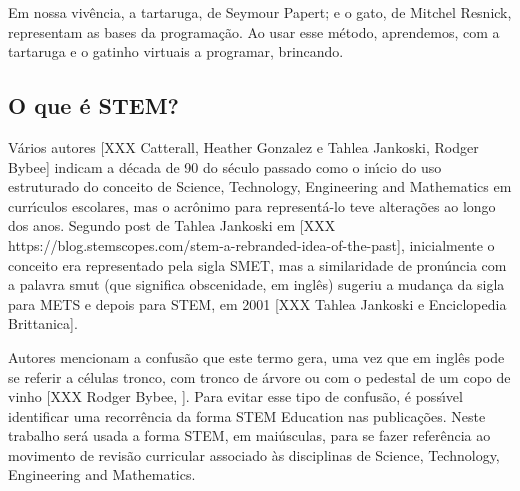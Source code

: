 \documentclass[
12pt,		%
openright,	%
twoside,  %
a4paper,			%
chapter=TITLE,		%
english,			%
french,				%
spanish,			%
brazil				%
]{USPSC-classe/USPSC}
\begin{document}
Em nossa viv\^encia, a tartaruga, de Seymour Papert; e o gato, de Mitchel Resnick,  representam as bases da  programa\c{c}\~ao. Ao usar esse m\'etodo, aprendemos, com a tartaruga e o gatinho virtuais a  programar,  brincando.














\subsection[O que \'e STEM?]{O que \'e STEM?}\label{O que \'e STEM?}
V\'arios autores [XXX Catterall, Heather Gonzalez e  Tahlea Jankoski, Rodger Bybee] indicam a d\'ecada de 90 do s\'eculo passado como o in\'{\i}cio do uso estruturado do conceito de Science, Technology, Engineering and Mathematics em curr\'{\i}culos escolares, mas o acr\^onimo para represent\'a-lo teve altera\c{c}\~oes ao longo dos anos. Segundo post de Tahlea Jankoski em [XXX https://blog.stemscopes.com/stem-a-rebranded-idea-of-the-past], inicialmente o conceito era representado pela sigla SMET, mas a similaridade de pron\'uncia com a palavra \textquotedbl smut (que significa obscenidade, em ingl\^es) sugeriu a mudan\c{c}a da sigla para METS e depois para STEM, em 2001 [XXX Tahlea Jankoski e Enciclopedia Brittanica]. 














Autores mencionam a confus\~ao que este termo gera, uma vez que em ingl\^es pode se referir a c\'elulas tronco, com tronco de \'arvore ou com o pedestal de um copo de vinho [XXX Rodger Bybee, ]. Para evitar esse tipo de confus\~ao, \'e poss\'{\i}vel identificar uma recorr\^encia da forma \textquotedbl STEM Education nas publica\c{c}\~oes. Neste trabalho ser\'a usada a forma STEM, em mai\'usculas, para se fazer refer\^encia ao movimento de revis\~ao curricular associado \`as disciplinas de \textquotedbl Science, Technology, Engineering and Mathematics.  
\end{document}
